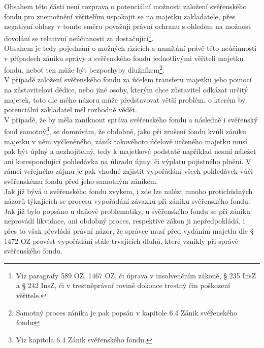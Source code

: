 \documentclass{article}
\begin{document}
Obsahem této části není rozprava o potenciální možnosti založení svěřenského fondu pro znemožnění věřitelům uspokojit se na majetku zakladatele, přes negativní ohlasy v tomto směru považuji právní ochranu s ohledem na možnost dovolání se relativní neúčinnosti za dostačující\footnote{Viz paragrafy 589 OZ, 1467 OZ, či úprava v insolvenčním zákoně, § 235 InsZ a § 242 InsZ, či v trestněprávní rovině dokonce trestný čin poškození věřitele.}.\\

Obsahem je tedy pojednání o možných rizicích a namítání právě této neúčinnosti v případech zániku správy a svěřenského fondu jednotlivými věřiteli majetku fondu, neboť ten může být bezpochyby dlužníkem\footnote{Samotný proces zániku je pak popsán v kapitole 6.4 Zánik svěřenského fondu}.\\


V případě založení svěřenského fondu za účelem transferu majetku jeho pomocí na zůstavitelovi dědice, nebo jiné osoby, kterým chce zůstavitel odkázat určitý majetek, toto dle mého názoru může představovat větší problém, o kterém by potenciální zakladatel měl rozhodně vědět.\\

V případě, že by měla zaniknout správa svěřenského fondu a následně i svěřenský fond samotný\footnote{Viz kapitola 6.4 Zánik svěřenského fondu.}, se domnívám, že obdobně, jako při zrušení fondu kvůli zániku majetku v něm vyčleněného, zánik takovéhoto účelově určeného majetku musí pak být úplný a nezhojitelný, tedy k majetkové podstatě například nesmí náležet ani korespondující pohledávka na úhradu újmy, či výplatu pojistného plnění. V rámci veřejného zájmu je pak vhodné zajistit vypořádání všech pohledávek vůči svěřenskému fondu před jeho samotným zánikem.\\

Jak již bývá u svěřenského fondu zvykem, i zde lze nalézt mnoho protichůdných názorů týkajících se procesu vypořádání závazků při zániku svěřenského fondu. Jak již bylo popsáno u daňové problematiky, u svěřenského fondu se při zániku neprovádí likvidace, ani obdobný proces, respektive zákon ji nepředpokládá, i přes to však převládá právní názor, že správce musí před vydáním majetlu dle § 1472 OZ provést vypořádání stále trvajících dluhů, které vznikly při správě svěřenského fondu.\\
\end{document}

